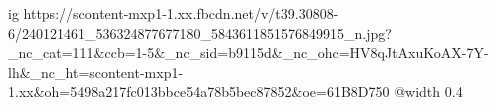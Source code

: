  
 
 
 
 

\ifcmt
  ig https://scontent-mxp1-1.xx.fbcdn.net/v/t39.30808-6/240121461_536324877677180_5843611851576849915_n.jpg?_nc_cat=111&ccb=1-5&_nc_sid=b9115d&_nc_ohc=HV8qJtAxuKoAX-7Y-lh&_nc_ht=scontent-mxp1-1.xx&oh=5498a217fc013bbce54a78b5bec87852&oe=61B8D750
  @width 0.4
\fi
